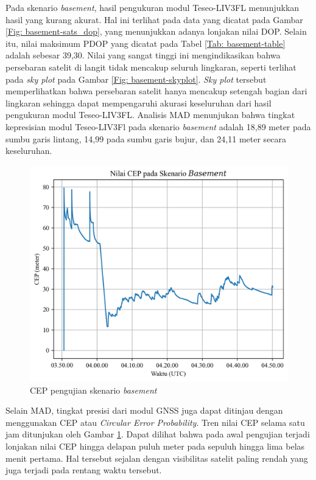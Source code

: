 Pada skenario \textit{basement}, hasil pengukuran modul Teseo\hyp{}LIV3FL menunjukkan hasil yang kurang akurat. Hal ini terlihat pada data yang dicatat pada Gambar \ref{Fig: basement-sats_dop}, yang menunjukkan adanya lonjakan nilai DOP. Selain itu, nilai maksimum PDOP yang dicatat pada Tabel \ref{Tab: basement-table} adalah sebesar 39,30. Nilai yang sangat tinggi ini mengindikasikan bahwa persebaran satelit di langit tidak mencakup seluruh lingkaran, seperti terlihat pada \textit{sky plot} pada Gambar \ref{Fig: basement-skyplot}. \textit{Sky plot} tersebut memperlihatkan bahwa persebaran satelit hanya mencakup setengah bagian dari lingkaran sehingga dapat mempengaruhi akurasi keseluruhan dari hasil pengukuran modul Teseo\hyp{}LIV3FL. Analisis MAD menunjukan bahwa tingkat kepresisian modul Teseo-LIV3Fl pada skenario \textit{basement} adalah 18,89 meter pada sumbu garis lintang, 14,99 pada sumbu garis bujur, dan 24,11 meter secara keseluruhan.

\begin{figure}[H]
	\centering
	\includegraphics[width=13cm]{contents/chapter-4/1-skenario-basement/cep.png}
	\caption{CEP pengujian skenario \textit{basement}}
	\label{Fig: basement-cep}
\end{figure}

Selain MAD, tingkat presisi dari modul GNSS juga dapat ditinjau dengan menggunakan CEP atau \textit{Circular Error Probability}. Tren nilai CEP selama satu jam ditunjukan oleh Gambar \ref{Fig: basement-cep}. Dapat dilihat bahwa pada awal pengujian terjadi lonjakan nilai CEP hingga delapan puluh meter pada sepuluh hingga lima belas menit pertama. Hal tersebut sejalan dengan visibilitas satelit paling rendah yang juga terjadi pada rentang waktu tersebut. 

